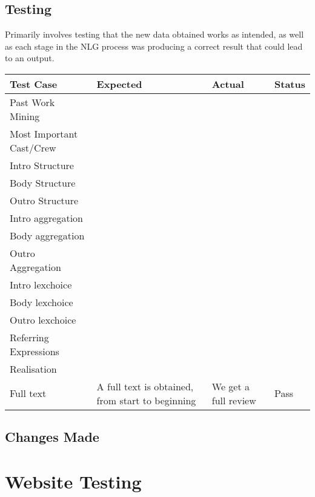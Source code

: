 \subsection{Testing}
Primarily involves testing that the new data obtained works as intended, as well as each stage in the NLG process was producing a correct result that could lead to an output.
\begin{center}
	\begin{tabular}{||m{15em} m{10em} m{10em} m{4em}||} 
		\hline
		Test Case & Expected & Actual & Status \\ [0.5ex] 
		\hline\hline
		Past Work Mining&&&\\
		\hline
		Most Important Cast/Crew&&&\\ 
		\hline
		Intro Structure&&&\\
		\hline
		Body Structure&&&\\
		\hline
		Outro Structure&&&\\
		\hline
		Intro aggregation&&&\\
		\hline
		Body aggregation&&&\\
		\hline
		Outro Aggregation&&&\\
		\hline
		Intro lexchoice&&&\\
		\hline
		Body lexchoice&&&\\
		\hline
		Outro lexchoice&&&\\
		\hline
		Referring Expressions&&&\\
		\hline
		Realisation&&&\\
		\hline	
		Full text& A full text is obtained, from start to beginning& We get a full review& Pass\\ [1ex] 
		\hline
		
	\end{tabular}
\end{center}

\subsection{Changes Made}



\section{Website Testing}
